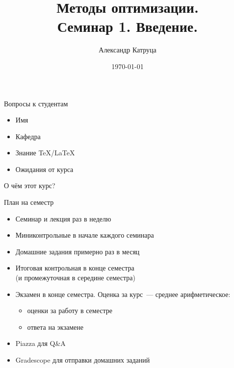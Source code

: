 \documentclass[12pt]{beamer}
\title[Семинар 1]{Методы оптимизации. \\
Семинар 1. Введение.}
\author{Александр Катруца}
\institute{Московский физико-технический институт,\\
Факультет Управления и Прикладной Математики}
\date{\today}
\begin{document}
\begin{frame}
\titlepage
\end{frame}

\begin{frame}{Вопросы к студентам}
\begin{itemize}
\item Имя
\item Кафедра
\item Знание \TeX/\LaTeX
\item Ожидания от курса
\end{itemize}

\end{frame}

\begin{frame}{О чём этот курс?}
\end{frame}

\begin{frame}{План на семестр}
\begin{itemize}[<+->]
\item Семинар и лекция раз в неделю
\item Миниконтрольные в начале каждого семинара
\item Домашние задания примерно раз в месяц
\item Итоговая контрольная в конце семестра \\ (и промежуточная в середине семестра)
\item Экзамен в конце семестра. 
Оценка за курс~--- среднее арифметическое:
\begin{itemize}
\item оценки за работу в семестре
\item ответа на экзамене
\end{itemize}
\item Piazza для Q\&A
\item Gradescope для отправки домашних заданий
\end{itemize}
\end{frame}
\end{document}
